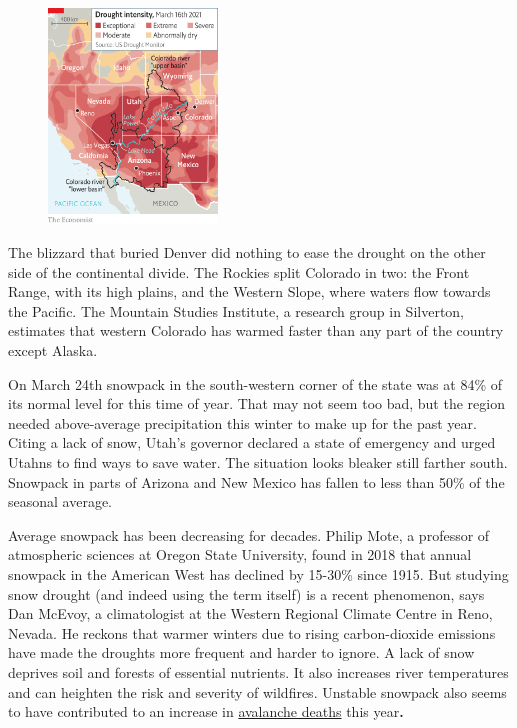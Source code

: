 \documentclass{article}
\begin{document}
\begin{figure}[h]
\centering
\includegraphics[width=0.4\textwidth]{images/20210327_usm942.png}
\end{figure}


The blizzard that buried Denver did nothing to ease the drought on the other side of the continental divide. The Rockies split Colorado in two: the Front Range, with its high plains, and the Western Slope, where waters flow towards the Pacific. The Mountain Studies Institute, a research group in Silverton, estimates that western Colorado has warmed faster than any part of the country except Alaska. 

On March 24th snowpack in the south-western corner of the state was at 84\% of its normal level for this time of year. That may not seem too bad, but the region needed above-average precipitation this winter to make up for the past year. Citing a lack of snow, Utah's governor declared a state of emergency and urged Utahns to find ways to save water. The situation looks bleaker still farther south. Snowpack in parts of Arizona and New Mexico has fallen to less than 50\% of the seasonal average. 

 

Average snowpack has been decreasing for decades. Philip Mote, a professor of atmospheric sciences at Oregon State University, found in 2018 that annual snowpack in the American West has declined by 15-30\% since 1915. But studying snow drought (and indeed using the term itself) is a recent phenomenon, says Dan McEvoy, a climatologist at the Western Regional Climate Centre in Reno, Nevada. He reckons that warmer winters due to rising carbon-dioxide emissions have made the droughts more frequent and harder to ignore. A lack of snow deprives soil and forests of essential nutrients. It also increases river temperatures and can heighten the risk and severity of wildfires. Unstable snowpack also seems to have contributed to an increase in \href{https://www.economist.com/graphic-detail/2021/03/03/avalanches-have-been-particularly-deadly-in-america-this-year}{avalanche deaths} this year\textbf{.} 
\end{document}
